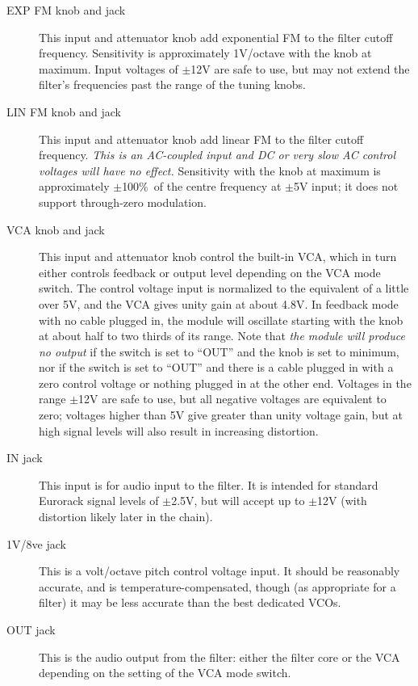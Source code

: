 \begin{description}
  \item[EXP FM knob and jack] This input and attenuator knob add
    exponential FM to the filter cutoff frequency.  Sensitivity is
    approximately 1V/octave with the knob at maximum.  Input voltages
    of $\pm$12V are safe to use, but may not extend the filter's frequencies
    past the range of the tuning knobs.

  \item[LIN FM knob and jack] This input and attenuator knob add linear FM
    to the filter cutoff frequency.  \textit{This is an AC-coupled input and
    DC or very slow AC control voltages will have no effect.}  Sensitivity
    with the knob at maximum is approximately $\pm$100\%\ of the centre
    frequency at $\pm$5V input; it does not support through-zero modulation.

  \item[VCA knob and jack]  This input and attenuator knob control the
    built-in VCA, which in turn either controls feedback or output level
    depending on the VCA mode switch. 
    The control voltage input is normalized to the equivalent of a
    little over 5V, and the
    VCA gives unity gain at about 4.8V.  In feedback mode with no cable
    plugged in, the module will oscillate starting with the knob at about
    half to two thirds of its range.  Note that \textit{the module will
    produce no output} if the switch is set to ``OUT'' and the knob is set
    to minimum, nor if the switch is set to ``OUT'' and there is a cable
    plugged in with a zero control voltage or nothing plugged in at the
    other end.  Voltages in the range $\pm$12V
    are safe to use, but all negative voltages are equivalent to zero;
    voltages higher than 5V give greater than unity voltage gain, but at
    high signal levels will also result in increasing distortion.

  \item[IN jack]  This input is for audio input to the filter.  It is
    intended for standard Eurorack signal levels of $\pm$2.5V, but will
    accept up to $\pm$12V (with distortion likely later in the chain).

  \item[1V/8ve jack]  This is a volt/octave pitch control voltage input.  It
    should be reasonably accurate, and is temperature-compensated, though
    (as appropriate for a filter) it may be less accurate than the best
    dedicated VCOs.

  \item[OUT jack]  This is the audio output from the filter:  either the
    filter core or the VCA depending on the setting of the VCA mode switch.
\end{description}

